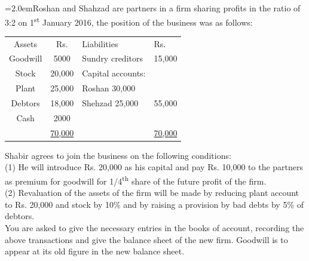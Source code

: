 \documentclass[11pt,a4paper]{article}
\newcommand{\lqn}[2]{\Needspace{6\baselineskip}\par\medskip\noindent\hangindent=2.0em\hangafter=1\makebox[2.0em][l]{\textbf{#1.}}#2\par}
\begin{document}
\lqn{94}{Roshan and Shahzad are partners in a firm sharing profits in the ratio of 3:2 on 1\textsuperscript{st} January 2016, the position of the business was as follows:\par
\par\smallskip\noindent\hspace*{1.2em}\begin{tabular}{|ccll|}
\hline
Assets & Rs. & Liabilities & Rs. \\
Goodwill & 5000 & Sundry creditors & 15,000 \\
Stock & 20,000 & Capital accounts: &  \\
Plant & 25,000 & Roshan     30,000 &  \\
Debtors & 18,000 & Shehzad   25,000 & 55,000 \\
Cash & 2000 &  &  \\
 & \underline{70,000} &  & \underline{70,000} \\
\hline
\end{tabular}\par\smallskip
Shabir agrees to join the business on the following conditions:\\
(1) He will introduce Rs. 20,000 as his capital and pay Rs. 10,000 to the partners as premium for goodwill for 1/4\textsuperscript{th}  share of the future profit of the firm.\\
(2) Revaluation of the assets of the firm will be made by reducing plant account to Rs. 20,000 and stock by 10\% and by raising a provision by bad debts by 5\% of debtors.\\
You are asked to give the necessary entries in the books of account, recording the above transactions and give the balance sheet of the new firm. Goodwill is to appear at its old figure in the new balance sheet.\par
}
\end{document}
